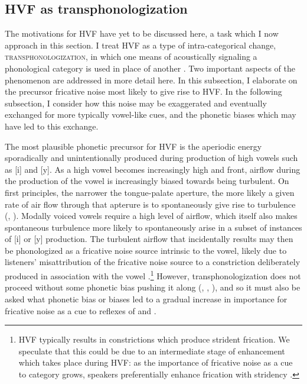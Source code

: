 \documentclass[output=paper,hidelinks]{langscibook}
\begin{document}
\subsection{HVF as transphonologization} \label{phonologization}\label{sec:faytak:3.2}


The motivations for HVF have yet to be discussed here, a task which I now approach in this section.
%
I treat HVF as a type of intra-categorical change, {\scshape trans\-phonologization}, in which one means of acoustically signaling a phonological category is used in place of another \citep{hyman-phono, hyman-enlarging, ohala93, kirby-diss, kirby}.
%
Two important aspects of the phenomenon are addressed in more detail here. In this subsection, I elaborate on the precursor fricative noise most likely to give rise to HVF.
%
In the following subsection, I consider how this noise may be exaggerated and eventually exchanged for more typically vowel-like cues, and the phonetic biases which may have led to this exchange.

The most plausible phonetic precursor for HVF is the aperiodic energy sporadically and unintentionally produced during production of high vowels such as [i] and [y].
%
As a high vowel becomes increasingly high and front, airflow during the production of the vowel is increasingly biased towards being turbulent.
%
On first principles, the narrower the tongue-palate aperture, the more likely a given rate of air flow through that apterure is to spontaneously give rise to turbulence (\citealt[39--44]{catford}, \citealt[3--5]{shadle}).
%
Modally voiced vowels require a high level of airflow, which itself also makes spontaneous turbulence more likely to spontaneously arise in a subset of instances of [i] or [y]{} production.
%
The turbulent airflow that incidentally results may then be phonologized as a fricative noise source intrinsic to the vowel,
likely due to listeners' misattribution of the fricative noise source to a constriction deliberately produced in association with the vowel \citep{ohala93}.\footnote{HVF typically results in constrictions which produce strident frication. We speculate that this could be due to an intermediate stage of enhancement which takes place during HVF: as the importance of fricative noise as a cue to category grows, speakers preferentially enhance frication with stridency \citep{kingston-diehl, stevens2010}.}
However, transphonologization does not proceed without some phonetic bias pushing it along (\citealt[3--6]{kirby}, \citealt{garrett-johnson}, \citealt{kirby-bias}), and so it must also be asked what phonetic bias or biases led to a gradual increase in importance for fricative noise as a cue to reflexes of  \pri{} and \pry{}.
\end{document}
